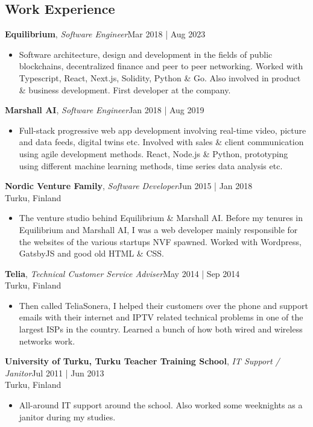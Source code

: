\documentclass[line,margin]{res}
\begin{document}
\begin{resume}
	\section{Work Experience}
	\textbf{Equilibrium}, {\sl Software Engineer}\hfill Mar 2018 | Aug 2023\\\begin{itemize} \itemsep 3pt
	\item Software architecture, design and development in the fields of public blockchains, decentralized finance and peer to peer networking. Worked with Typescript, React, Next.js, Solidity, Python \& Go. Also involved in product \& business development. First developer at the company.
	\end{itemize}
	\textbf{Marshall AI}, {\sl Software Engineer}\hfill Jan 2018 | Aug 2019\\\begin{itemize} \itemsep 3pt
	\item Full-stack progressive web app development involving real-time video, picture and data feeds, digital twins etc. Involved with sales \& client communication using agile development methods. React, Node.js \& Python, prototyping using different machine learning methods, time series data analysis etc.
	\end{itemize}
	\textbf{Nordic Venture Family}, {\sl Software Developer}\hfill Jun 2015 | Jan 2018\\Turku, Finland\\\begin{itemize} \itemsep 3pt
	\item The venture studio behind Equilibrium \& Marshall AI. Before my tenures in Equilibrium and Marshall AI, I was a web developer mainly responsible for the websites of the various startups NVF spawned. Worked with Wordpress, GatsbyJS and good old HTML \& CSS.
	\end{itemize}
	\textbf{Telia}, {\sl Technical Customer Service Adviser}\hfill May 2014 | Sep 2014\\Turku, Finland\\\begin{itemize} \itemsep 3pt
	\item Then called TeliaSonera, I helped their customers over the phone and support emails with their internet and IPTV related technical problems in one of the largest ISPs in the country. Learned a bunch of how both wired and wireless networks work.
	\end{itemize}
	\textbf{University of Turku, Turku Teacher Training School}, {\sl IT Support / Janitor}\hfill Jul 2011 | Jun 2013\\Turku, Finland\\\begin{itemize} \itemsep 3pt
	\item All-around IT support around the school. Also worked some weeknights as a janitor during my studies.
	\end{itemize}

\end{resume}
\end{document}

